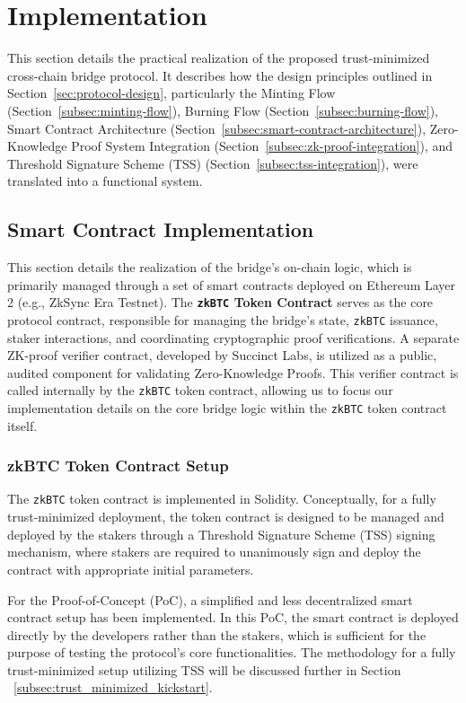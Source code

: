 \documentclass{DESSThesis}
\newcommand{\zktoken}{\texttt{zkBTC}}
\begin{document}
    


\chapter{Implementation} \label{chap:implementation}
\thispagestyle{empty}
This section details the practical realization of the proposed trust-minimized cross-chain bridge protocol. It describes how the design principles outlined in Section~\ref{sec:protocol-design}, particularly the Minting Flow (Section~\ref{subsec:minting-flow}), Burning Flow (Section~\ref{subsec:burning-flow}), Smart Contract Architecture (Section~\ref{subsec:smart-contract-architecture}), Zero-Knowledge Proof System Integration (Section~\ref{subsec:zk-proof-integration}), and Threshold Signature Scheme (TSS) (Section~\ref{subsec:tss-integration}), were translated into a functional system.

\section{Smart Contract Implementation}
This section details the realization of the bridge's on-chain logic, which is primarily managed through a set of smart contracts deployed on Ethereum Layer 2 (e.g., ZkSync Era Testnet). The \textbf{\texttt{\zktoken} Token Contract} serves as the core protocol contract, responsible for managing the bridge's state, \texttt{\zktoken} issuance, staker interactions, and coordinating cryptographic proof verifications. A separate ZK-proof verifier contract, developed by Succinct Labs, is utilized as a public, audited component for validating Zero-Knowledge Proofs. This verifier contract is called internally by the \texttt{\zktoken} token contract, allowing us to focus our implementation details on the core bridge logic within the \texttt{\zktoken} token contract itself.

\subsection{zkBTC Token Contract Setup}
The \texttt{\zktoken} token contract is implemented in Solidity. Conceptually, for a fully trust-minimized deployment, the token contract is designed to be managed and deployed by the stakers through a Threshold Signature Scheme (TSS) signing mechanism, where stakers are required to unanimously sign and deploy the contract with appropriate initial parameters.

For the Proof-of-Concept (PoC), a simplified and less decentralized smart contract setup has been implemented. In this PoC, the smart contract is deployed directly by the developers rather than the stakers, which is sufficient for the purpose of testing the protocol's core functionalities. The methodology for a fully trust-minimized setup utilizing TSS will be discussed further in Section ~\ref{subsec:trust_minimized_kickstart}.
\end{document}
